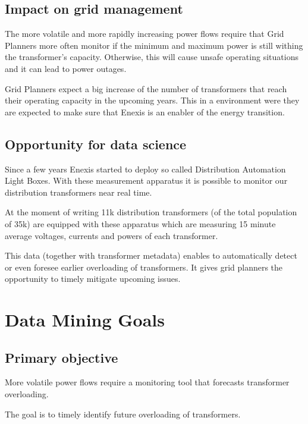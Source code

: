 \documentclass[letterpaper,10pt,english]{sphinxmanual}
\begin{document}
\subsection{Impact on grid management}
\label{\detokenize{business_understanding:impact-on-grid-management}}
\begin{DUlineblock}{0em}
\item[] The more volatile and more rapidly increasing power flows require that Grid Planners more often monitor if the minimum and maximum power is still withing the transformer’s capacity. Otherwise, this will cause unsafe operating situations and it can lead to power outages.
\item[] Grid Planners expect a big increase of the number of transformers that reach their operating capacity in the upcoming years. This in a environment were they are expected to make sure that Enexis is an enabler of the energy transition.
\end{DUlineblock}


\subsection{Opportunity for data science}
\label{\detokenize{business_understanding:opportunity-for-data-science}}
\begin{DUlineblock}{0em}
\item[] Since a few years Enexis started to deploy so called Distribution Automation Light Boxes. With these measurement apparatus it is possible to monitor our distribution transformers near real time.
\item[] At the moment of writing 11k distribution transformers (of the total population of 35k) are equipped with these apparatus which are measuring 15 minute average voltages, currents and powers of each transformer.
\item[] This data (together with transformer metadata) enables to automatically detect or even foresee earlier overloading of transformers. It gives grid planners the opportunity to timely mitigate upcoming issues.
\end{DUlineblock}


\section{Data Mining Goals}
\label{\detokenize{business_understanding:data-mining-goals}}

\subsection{Primary objective}
\label{\detokenize{business_understanding:primary-objective}}
\begin{DUlineblock}{0em}
\item[] More volatile power flows require a monitoring tool that forecasts transformer overloading.
\item[] The goal is to timely identify future overloading of transformers.
\end{DUlineblock}
\end{document}
